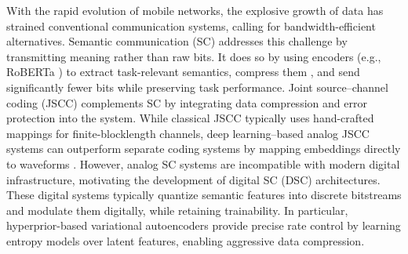 \documentclass[journal]{IEEEtran}
\begin{document}
{
With the rapid evolution of mobile networks, the explosive growth of data has strained conventional communication systems, calling for bandwidth-efficient alternatives. 
Semantic communication (SC) addresses this challenge by transmitting meaning rather than raw bits. It does so by using encoders (e.g., RoBERTa \cite{Roberta}) to extract task-relevant semantics, compress them \cite{compress1,compress2,compress3,compress4}, and send significantly fewer bits while preserving task performance.}
Joint source–channel coding (JSCC) complements SC by integrating data compression and error protection into the system. While classical JSCC typically uses hand-crafted mappings for finite-blocklength 
channels, 
 deep learning–based analog JSCC systems can outperform separate coding systems by mapping embeddings directly to waveforms \cite{analog_jscc_text}. However, analog SC systems are incompatible with modern digital infrastructure, motivating the development of digital SC (DSC) architectures. These digital systems typically quantize semantic features into discrete bitstreams and modulate them digitally, while retaining trainability. In particular, hyperprior-based variational autoencoders \cite{d2jscc_hyperprior_vae} provide precise rate control by learning entropy models over latent features, enabling aggressive data compression.
\end{document}
